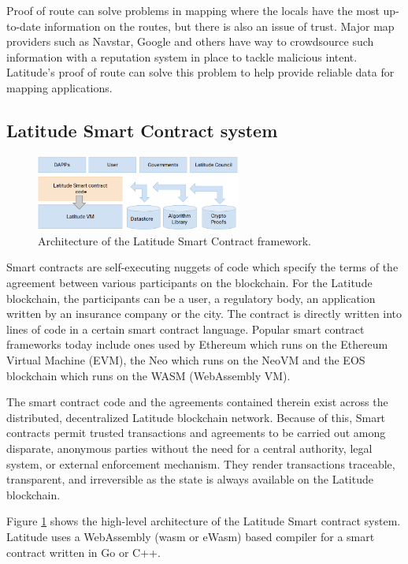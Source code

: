 Proof of route can solve problems in mapping where the locals have the most up-to-date information on the routes, but
there is also an issue of trust. Major map providers such as Navstar, Google and others have way to crowdsource such
information with a reputation system in place to tackle malicious intent. Latitude's proof of route can solve this
problem to help provide reliable data for mapping applications.

\subsection{Latitude Smart Contract system}

\begin{figure}[t]
    \centering
    \includegraphics[width=0.60\textwidth]{lat_sc.png}
  \caption{Architecture of the Latitude Smart Contract framework.}
    \label{fig:lat-sc}
\end{figure}

Smart contracts are self-executing nuggets of code which specify the terms of the agreement between various participants
on the blockchain. For the Latitude blockchain, the participants can be a user, a regulatory body, an application
written by an insurance company or the city. The contract is directly written into lines of code in a certain smart
contract language. Popular smart contract frameworks today include ones used by Ethereum which runs on the Ethereum Virtual Machine (EVM),
the Neo which runs on the NeoVM and the EOS blockchain which runs on the WASM (WebAssembly VM).

The smart contract code and the agreements contained therein exist across the distributed, decentralized Latitude
blockchain network.  Because of this, Smart contracts permit trusted transactions and agreements to be carried out among
disparate, anonymous parties without the need for a central authority, legal system, or external enforcement mechanism.
They render transactions traceable, transparent, and irreversible as the state is always available on the Latitude
blockchain.

Figure \ref{fig:lat-sc} shows the high-level architecture of the Latitude Smart contract system. Latitude uses a
WebAssembly (wasm or eWasm) based compiler for a smart contract written in Go or C++. 

